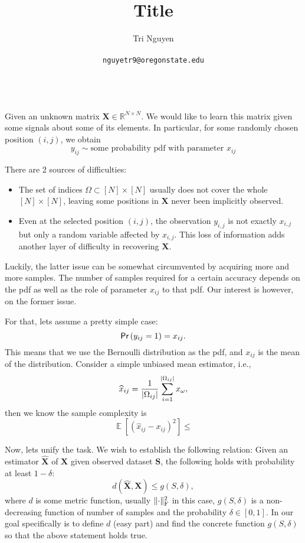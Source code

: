 \documentclass[11pt,a4paper]{article}
\title{Title}
\author{	Tri Nguyen \\\\
        \texttt{nguyetr9@oregonstate.edu} \\\\
        }
\begin{document}
\maketitle

Given an unknown matrix $\bm{X} \in \mathbb{R}^{N \times N}$. We would like to learn this matrix given some signals about some of its elements. In particular, for some randomly chosen position $(i,j)$, we obtain
\[
y_{ij} \sim \text{some probability pdf with parameter } x_{ij}
\] 

There are 2 sources of difficulties:
\begin{itemize}
\item The set of indices $\Omega \subset [N] \times [N]$ usually does not cover the whole $[N] \times [N]$, leaving some positions in $\bm{X}$ never been implicitly observed.
\item Even at the selected position $(i,j)$, the observation $y_{i,j}$ is not exactly $x_{i,j}$ but only a random variable affected by $x_{i,j}$. This loss of information adds another layer of difficulty in recovering $\bm{X}$.
\end{itemize}
Luckily, the latter issue can be somewhat circumvented by acquiring more and more samples. The number of samples required for a certain accuracy depends on the pdf as well as the role of parameter $x_{ij}$ to that pdf. Our interest is however, on the former issue.

For that, lets assume a pretty simple case:
\[
\textsf{Pr}\left(y_{ij}=1\right) = x_{ij}.
\] 
This means that we use the Bernoulli distribution as the pdf, and $x_{ij}$ is the mean of the distribution. Consider a simple unbiased mean estimator, i.e., 
\[
\widehat{x}_{ij} = \dfrac{1}{\left\lvert\Omega_{ij}\right\rvert}\sum^{\left\lvert\Omega_{ij}\right\rvert}_{i=1} x_{\omega},
\] 
then we know the sample complexity is
\[
    \mathop{\mathbb{E}}[(\widehat{x}_{ij} - x_{ij})^2] \leq 
\] 

Now, lets unify the task. We wish to establish the following relation: Given an estimator $\widehat{\bm{X}}$ of $\bm{X}$ given observed dataset $\bm{S}$, the following holds with probability at least $1-\delta$:
\[
d(\widehat{\bm{X}}, \bm{X}) \leq g(S, \delta),
\] 
where $d$ is some metric function, usually $\lVert\cdot\rVert_{\rm F}^2$ in this case, $g(S, \delta)$ is a non-decreasing function of number of samples and the probability $\delta \in [0,1]$. In our goal specifically is to define $d$ (easy part) and find the concrete function $g(S, \delta)$ so that the above statement holds true.
\end{document}
